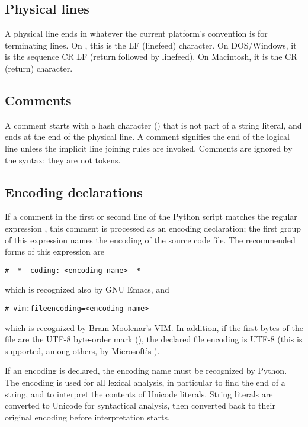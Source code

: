 \subsection{Physical lines\label{physical}}

A physical line ends in whatever the current platform's convention is
for terminating lines.  On \UNIX, this is the \ASCII{} LF (linefeed)
character.  On DOS/Windows, it is the \ASCII{} sequence CR LF (return
followed by linefeed).  On Macintosh, it is the \ASCII{} CR (return)
character.


\subsection{Comments\label{comments}}

A comment starts with a hash character (\code{\#}) that is not part of
a string literal, and ends at the end of the physical line.  A comment
signifies the end of the logical line unless the implicit line joining
rules are invoked.
Comments are ignored by the syntax; they are not tokens.


\subsection{Encoding declarations\label{encodings}}

If a comment in the first or second line of the Python script matches
the regular expression , this comment is
processed as an encoding declaration; the first group of this
expression names the encoding of the source code file. The recommended
forms of this expression are

\begin{verbatim}
# -*- coding: <encoding-name> -*-
\end{verbatim}

which is recognized also by GNU Emacs, and

\begin{verbatim}
# vim:fileencoding=<encoding-name>
\end{verbatim}

which is recognized by Bram Moolenar's VIM. In addition, if the first
bytes of the file are the UTF-8 byte-order mark
(), the declared file encoding is UTF-8
(this is supported, among others, by Microsoft's ).

If an encoding is declared, the encoding name must be recognized by
Python. %
The encoding is used for all lexical analysis, in particular to find
the end of a string, and to interpret the contents of Unicode literals.
String literals are converted to Unicode for syntactical analysis,
then converted back to their original encoding before interpretation
starts.

